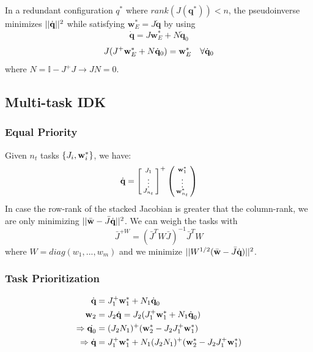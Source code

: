 \documentclass[a4paper, 8pt]{extarticle}
\begin{document}
\begin{multicols*}{3}
In a redundant configuration $q^*$ where $rank(J(\mathbf q^*)) < n$, the pseudoinverse minimizes $||\dot{\textbf q}||^2$ while satisfying $\textbf{w}_E^* = J\dot{\mathbf q}$ by using
$$ \dot{\mathbf q}=J\textbf{w}_E^*+N\dot{\mathbf q}_0$$
$$J(J^+\textbf w_E^* + N\dot{\mathbf q}_0) = \textbf w_E^* \quad \forall\dot{\mathbf q}_0$$
where $N = \mathbb I - J^+J \longrightarrow JN=0$.



\subsection{Multi-task IDK}
\subsubsection*{Equal Priority}
Given $n_t$ tasks $\{J_i, \textbf w^*_i\}$, we have:
$$\dot{\textbf q} = \left[\begin{smallmatrix}
J_1\\ \vdots \\ J_{n_t}
\end{smallmatrix}\right]^+  \left(\begin{smallmatrix}
\textbf w_1^* \\ \vdots \\ \textbf w_{n_t}^*
\end{smallmatrix}\right)$$
In case the row-rank of the stacked Jacobian is greater that the column-rank, we are only minimizing $||\bar{\textbf w} - \bar J\dot{\textbf q}||^2$. We can weigh the tasks with
$$\bar J^{+W} = (\bar J^T W \bar J)^{-1}\bar J^{T} W$$
where $W = diag(w_1,...,w_m)$ and we minimize $||W^{1/2}(\bar{\textbf w} - \bar J\dot{\textbf q})||^2$.


\subsubsection*{Task Prioritization}
\begin{align*}
\dot{\textbf{q}} &= J_1^+\textbf w_1^* + N_1\dot{\textbf{q}}_0\\
\textbf{w}_2 &= J_2\dot{\mathbf q} = J_2(J_1^+\textbf w_1^* + N_1\dot{\textbf{q}}_0)\\
\Rightarrow \dot{\textbf q_0} &= (J_2N_1)^+(\textbf w_2^* - J_2J_1^+\textbf w_1^*)\\
\Rightarrow \dot{\textbf{q}} &= J_1^+\textbf w_1^* + N_1(J_2N_1)^+(\textbf w_2^* - J_2J_1^+\textbf w_1^*)
\end{align*}


\end{multicols*}
\end{document}
